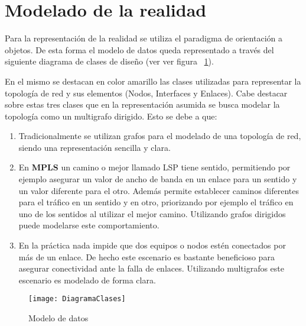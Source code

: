 
\section[Modelado de la realidad]{Modelado de la realidad}

Para la representaci\'on de la realidad se utiliza el paradigma de orientaci\'on a objetos. De esta forma el modelo de datos queda representado a través del siguiente diagrama de clases de diseño (ver ver figura ~\ref{fig:ModeloDeDatos}).

En el mismo se destacan en color amarillo las clases utilizadas para representar la topolog\'ia de red y sus elementos (Nodos, Interfaces y Enlaces). Cabe destacar sobre estas tres clases que en la representaci\'on asumida se busca modelar la topolog\'ia como un multigrafo dirigido. Esto se debe a que:

\begin{enumerate}
\item Tradicionalmente se utilizan grafos para el modelado de una topolog\'ia de red, siendo una representaci\'on sencilla y clara.

\item En \textbf{MPLS} un camino o mejor llamado LSP tiene sentido, permitiendo por ejemplo asegurar un valor de ancho de banda en un enlace para un sentido y un valor diferente para el otro. Adem\'as permite establecer caminos diferentes para el tr\'afico en un sentido y en otro, priorizando por ejemplo el tr\'afico  en uno de los sentidos al utilizar el mejor camino. Utilizando grafos dirigidos puede modelarse este comportamiento.

\item En la pr\'actica nada impide que dos equipos o nodos est\'en conectados por m\'as de un enlace. De hecho este escenario es bastante beneficioso para asegurar conectividad ante la falla de enlaces. Utilizando multigrafos este escenario es modelado de forma clara.
  
\end{enumerate}

\begin{figure}[ht!] 
\centering    
\texttt{[image: DiagramaClases]}
\caption[Modelo de datos]{Modelo de datos}
\label{fig:ModeloDeDatos}
\end{figure}

